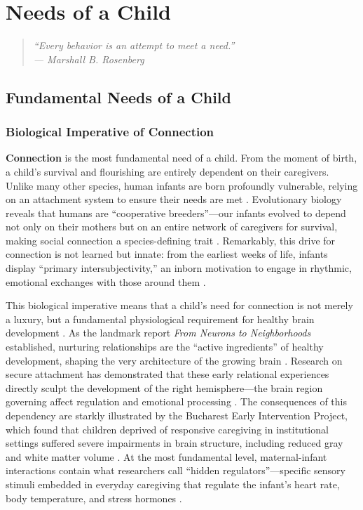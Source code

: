 \chapter{Needs of a Child}

\begin{quote}
\itshape ``Every behavior is an attempt to meet a need.''\\
\upshape --- Marshall B. Rosenberg
\end{quote}
\newpage
\section{Fundamental Needs of a Child}

\subsection{Biological Imperative of Connection}
\textbf{Connection} is the most fundamental need of a child.
From the moment of birth, a child's survival and flourishing are entirely dependent on their caregivers.
Unlike many other species, human infants are born profoundly vulnerable, relying on an attachment system to ensure their needs are met \citep{bowlby1969}.
Evolutionary biology reveals that humans are ``cooperative breeders''---our infants evolved to depend not only on their mothers but on an entire network of caregivers for survival, making social connection a species-defining trait \citep{hrdy2009}.
Remarkably, this drive for connection is not learned but innate: from the earliest weeks of life, infants display ``primary intersubjectivity,'' an inborn motivation to engage in rhythmic, emotional exchanges with those around them \citep{trevarthen1979}.

This biological imperative means that a child's need for connection is not merely a luxury, but a fundamental physiological requirement for healthy brain development \citep{feldman2024}.
As the landmark report \emph{From Neurons to Neighborhoods} established, nurturing relationships are the ``active ingredients'' of healthy development, shaping the very architecture of the growing brain \citep{shonkoff2000}.
Research on secure attachment has demonstrated that these early relational experiences directly sculpt the development of the right hemisphere---the brain region governing affect regulation and emotional processing \citep{schore2001}.
The consequences of this dependency are starkly illustrated by the Bucharest Early Intervention Project, which found that children deprived of responsive caregiving in institutional settings suffered severe impairments in brain structure, including reduced gray and white matter volume \citep{nelson2014}.
At the most fundamental level, maternal-infant interactions contain what researchers call ``hidden regulators''---specific sensory stimuli embedded in everyday caregiving that regulate the infant's heart rate, body temperature, and stress hormones \citep{hofer1994}.

